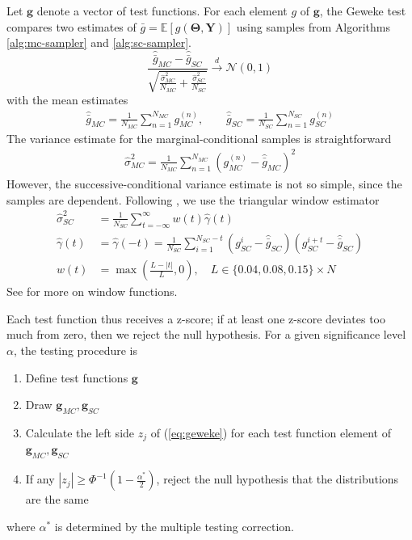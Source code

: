 \documentclass[a4paper,11pt]{article}
\newcommand{\E}{\mathbb{E}}
\begin{document}
Let $\mathbf{g}$ denote a vector of test functions. For each element $g$ of $\mathbf{g}$, the Geweke test compares two estimates of $\bar{g} = \E[g(\mathbf{\Theta}, \mathbf{Y})]$ using samples from Algorithms \ref{alg:mc-sampler} and \ref{alg:sc-sampler}.
\begin{equation}
    \frac{\hat{\bar{g}}_{MC} - \hat{\bar{g}}_{SC}}{\sqrt{ \frac{\hat{\sigma}^{2}_{MC}}{N_{MC}} + \frac{\hat{\sigma}^{2}_{SC}}{N_{SC}}}} \xrightarrow[]{d} \mathcal{N}(0, 1)
    \label{eq:geweke}
\end{equation}
with the mean estimates
\begin{align*}
    \hat{\bar{g}}_{MC} = \frac{1}{N_{MC}}\sum_{n=1}^{N_{MC}}g_{MC}^{(n)}, \qquad \hat{\bar{g}}_{SC} = \frac{1}{N_{SC}}\sum_{n=1}^{N_{SC}}g_{SC}^{(n)}
\end{align*}
The variance estimate for the marginal-conditional samples is straightforward
\begin{align*}
    \hat{\sigma}_{MC}^{2} = \frac{1}{N_{MC}}\sum_{n=1}^{N_{MC}}(g_{MC}^{(n)} - \hat{\bar{g}}_{MC})^{2}
\end{align*}
However, the successive-conditional variance estimate is not so simple, since the samples are dependent. Following \cite{geweke_using_1999}, we use the triangular window estimator
\begin{align*}
    \hat{\sigma}_{SC}^{2} &= \frac{1}{N_{SC}}\sum_{t=-\infty}^{\infty} w(t) \hat{\gamma}(t) \\
    \hat{\gamma}(t) &= \hat{\gamma}(-t) = \frac{1}{N_{SC}}\sum_{i=1}^{N_{SC}-t}(g_{SC}^{i} - \hat{\bar{g}}_{SC})(g_{SC}^{i+t} - \hat{\bar{g}}_{SC}) \\
    w(t) &= \max{\left(\frac{L-|t|}{L}, 0\right)}, \quad L \in \{0.04, 0.08, 0.15\} \times N
\end{align*}
See \cite{priestley_spectral_1981} for more on window functions.

Each test function thus receives a z-score; if at least one z-score deviates too much from zero, then we reject the null hypothesis. For a given significance level $\alpha$, the testing procedure is
\begin{enumerate}
    \item Define test functions $\mathbf{g}$
    \item Draw $\mathbf{g}_{MC}, \mathbf{g}_{SC}$
    \item Calculate the left side $z_{j}$ of (\ref{eq:geweke}) for each test function element of $\mathbf{g}_{MC}, \mathbf{g}_{SC}$
    \item If any $|z_{j}| \geq \Phi^{-1}(1-\frac{\alpha^{*}}{2})$, reject the null hypothesis that the distributions are the same
\end{enumerate}
where $\alpha^{*}$ is determined by the multiple testing correction.
\end{document}
